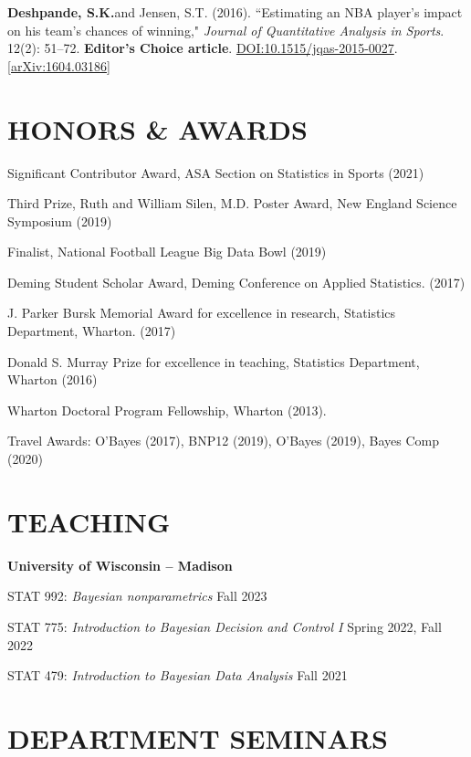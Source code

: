 \documentclass[margin]{res}
\def\skd{\textbf{Deshpande, S.K.}}
\begin{document}
\begin{resume}
\skd and Jensen, S.T. (2016). ``Estimating an NBA player's impact on his team's chances of winning," \textit{Journal of Quantitative Analysis in Sports}. 12(2): 51--72. \textbf{Editor's Choice article}.  \href{https://doi.org/10.1515/jqas-2015-0027}{DOI:10.1515/jqas-2015-0027}.\href{https://arxiv.org/abs/1604.03186}{[arXiv:1604.03186]}


\section{HONORS \& AWARDS} 

Significant Contributor Award, ASA Section on Statistics in Sports (2021)

Third Prize, Ruth and William Silen, M.D. Poster Award, New England Science Symposium (2019)

Finalist, National Football League Big Data Bowl (2019)

Deming Student Scholar Award, Deming Conference on Applied Statistics. (2017)

J. Parker Bursk Memorial Award for excellence in research, Statistics Department, Wharton. (2017)

Donald S. Murray Prize for excellence in teaching, Statistics Department, Wharton (2016)

Wharton Doctoral Program Fellowship, Wharton (2013).

Travel Awards: O'Bayes (2017), BNP12 (2019), O'Bayes (2019), Bayes Comp (2020)

\section{TEACHING}

\textbf{University of Wisconsin -- Madison} 

STAT 992: {\it Bayesian nonparametrics} \hfill Fall 2023

STAT 775: {\it Introduction to Bayesian Decision and Control I} \hfill Spring 2022, Fall 2022

STAT 479: {\it Introduction to Bayesian Data Analysis} \hfill Fall 2021

\section{DEPARTMENT \hspace{0.1in} SEMINARS}


\end{resume}
\end{document}
